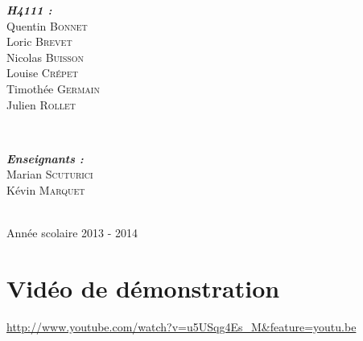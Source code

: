 \documentclass[a4paper]{report}
\let\stdsection\section
\renewcommand\section{\newpage\stdsection}
\begin{document}
\begin{titlepage}
\begin{minipage}{0.4\textwidth}
\begin{flushleft} \large
\textbf{\emph{H4111 :}}\\
Quentin \textsc{Bonnet}\\
Loric \textsc{Brevet}\\
Nicolas \textsc{Buisson}\\
Louise \textsc{Crépet}\\
Timothée \textsc{Germain}\\
Julien \textsc{Rollet}%
\end{flushleft}
\end{minipage}
~
\begin{minipage}{0.4\textwidth}
\begin{flushright} \large
\textbf{\emph{Enseignants :}} \\
Marian \textsc{Scuturici}\\
Kévin \textsc{Marquet}%
\end{flushright}
\end{minipage}\\[4cm]



{\large Année scolaire 2013 - 2014}\\[3cm] %


 

\vfill %

\end{titlepage}

\clearpage
\tableofcontents
\clearpage









\section{Vidéo de démonstration}
\url{http://www.youtube.com/watch?v=u5USqg4Es_M&feature=youtu.be}
\end{document}
